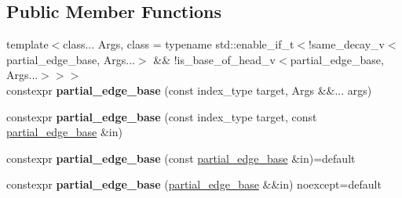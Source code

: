 \subsection*{Public Member Functions}
\begin{DoxyCompactItemize}
\item 
\mbox{\label{classsequoia_1_1maths_1_1partial__edge__base_a66a79658c2caff1cb863cac5cd33a618}} 
{\footnotesize template$<$class... Args, class  = typename std\+::enable\+\_\+if\+\_\+t$<$!same\+\_\+decay\+\_\+v$<$partial\+\_\+edge\+\_\+base, Args...$>$ \&\& !is\+\_\+base\+\_\+of\+\_\+head\+\_\+v$<$partial\+\_\+edge\+\_\+base, Args...$>$$>$$>$ }\\constexpr {\bfseries partial\+\_\+edge\+\_\+base} (const index\+\_\+type target, Args \&\&... args)
\item 
\mbox{\label{classsequoia_1_1maths_1_1partial__edge__base_a8e5fe9b96767b35c1ec28e7b5a3dd4b1}} 
constexpr {\bfseries partial\+\_\+edge\+\_\+base} (const index\+\_\+type target, const \mbox{\hyperlink{classsequoia_1_1maths_1_1partial__edge__base}{partial\+\_\+edge\+\_\+base}} \&in)
\item 
\mbox{\label{classsequoia_1_1maths_1_1partial__edge__base_a9ef98fb04c9a7a95ffaec006aaa521b4}} 
constexpr {\bfseries partial\+\_\+edge\+\_\+base} (const \mbox{\hyperlink{classsequoia_1_1maths_1_1partial__edge__base}{partial\+\_\+edge\+\_\+base}} \&in)=default
\item 
\mbox{\label{classsequoia_1_1maths_1_1partial__edge__base_aeb18ee24992163aa564670753dfae51b}} 
constexpr {\bfseries partial\+\_\+edge\+\_\+base} (\mbox{\hyperlink{classsequoia_1_1maths_1_1partial__edge__base}{partial\+\_\+edge\+\_\+base}} \&\&in) noexcept=default
\end{DoxyCompactItemize}
